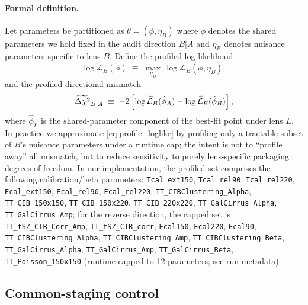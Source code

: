 \paragraph{Formal definition.}
Let parameters be partitioned as $\theta=(\phi,\eta_B)$ where $\phi$ denotes the shared parameters we hold fixed in the audit direction $B|A$ and $\eta_B$ denotes nuisance parameters specific to lens $B$. Define the profiled log-likelihood
\begin{equation}
  \log \widetilde{\mathcal{L}}_B(\phi) \;\equiv\; \max_{\eta_B}\, \log \mathcal{L}_B(\phi,\eta_B),
  \label{eq:profile_loglike}
\end{equation}
and the profiled directional mismatch
\begin{equation}
  \widetilde{\Delta \chi^2}_{B|A} \;\equiv\; -2\left[\log \widetilde{\mathcal{L}}_B(\hat\phi_A) - \log \widetilde{\mathcal{L}}_B(\hat\phi_B)\right],
  \label{eq:profile_dchi}
\end{equation}
where $\hat\phi_L$ is the shared-parameter component of the best-fit point under lens $L$.
In practice we approximate \cref{eq:profile_loglike} by profiling only a tractable subset of $B$'s nuisance parameters under a runtime cap; the intent is not to ``profile away'' all mismatch, but to reduce sensitivity to purely lens-specific packaging degrees of freedom.
In our implementation, the profiled set comprises the following calibration/beta parameters: \texttt{Tcal\_ext150}, \texttt{Tcal\_rel90}, \texttt{Tcal\_rel220}, \texttt{Ecal\_ext150}, \texttt{Ecal\_rel90}, \texttt{Ecal\_rel220}, \texttt{TT\_CIBClustering\_Alpha}, \texttt{TT\_CIB\_150x150}, \texttt{TT\_CIB\_150x220}, \texttt{TT\_CIB\_220x220}, \texttt{TT\_GalCirrus\_Alpha}, \texttt{TT\_GalCirrus\_Amp}; for the reverse direction, the capped set is \texttt{TT\_tSZ\_CIB\_Corr\_Amp}, \texttt{TT\_tSZ\_CIB\_corr}, \texttt{Ecal150}, \texttt{Ecal220}, \texttt{Ecal90}, \texttt{TT\_CIBClustering\_Alpha}, \texttt{TT\_CIBClustering\_Amp}, \texttt{TT\_CIBClustering\_Beta}, \texttt{TT\_GalCirrus\_Alpha}, \texttt{TT\_GalCirrus\_Amp}, \texttt{TT\_GalCirrus\_Beta}, \texttt{TT\_Poisson\_150x150} (runtime-capped to 12 parameters; see run metadata).

\subsection{Common-staging control}
\label{sec:common-staging}

